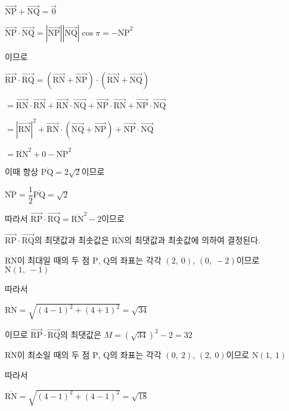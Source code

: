 \documentclass{oblivoir}
\begin{document}
$\overrightarrow{\mathrm{NP}} +\overrightarrow{\mathrm{NQ}} =\overrightarrow{0}$

$\overrightarrow{\mathrm{NP}}\cdot\overrightarrow{\mathrm{NQ}}= |\overrightarrow{\mathrm{NP}}| |\overrightarrow{\mathrm{NQ}}|\cos\pi = -\overline{\mathrm{NP}}^{2}$

이므로

$\overrightarrow{\mathrm{RP}}\cdot\overrightarrow{\mathrm{RQ}}$$=(\overrightarrow{\mathrm{RN}} +\overrightarrow{\mathrm{NP}})\cdot(\overrightarrow{\mathrm{RN}} +\overrightarrow{\mathrm{NQ}})$

$=\overrightarrow{\mathrm{RN}}\cdot\overrightarrow{\mathrm{RN}} +\overrightarrow{\mathrm{RN}}\cdot\overrightarrow{\mathrm{NQ}} +\overrightarrow{\mathrm{NP}}\cdot\overrightarrow{\mathrm{RN}} +\overrightarrow{\mathrm{NP}}\cdot\overrightarrow{\mathrm{NQ}}$

$= |\overrightarrow{\mathrm{RN}} |^{2}+\overrightarrow{\mathrm{RN}}\cdot(\overrightarrow{\mathrm{NQ}} +\overrightarrow{\mathrm{NP}})+\overrightarrow{\mathrm{NP}}\cdot\overrightarrow{\mathrm{NQ}}$

$=\overline{\mathrm{RN}}^{2}+0 -\overline{\mathrm{NP}}^{2}$

이때 항상 $\overline{\mathrm{PQ}} = 2\sqrt{2}$이므로

$\overline{\mathrm{NP}} =\dfrac{1}{2}\overline{\mathrm{PQ}} =\sqrt{2}$

따라서 $\overrightarrow{\mathrm{RP}}\cdot\overrightarrow{\mathrm{RQ}}$$=\overline{\mathrm{RN}}^{2}-2$이므로 

$\overrightarrow{\mathrm{RP}}\cdot\overrightarrow{\mathrm{RQ}}$의 최댓값과 최솟값은 $\overline{\mathrm{RN}}$의 최댓값과 최솟값에 의하여 결정된다.

$\overline{\mathrm{RN}}$이 최대일 때의 두 점 $\mathrm{P}$, $\mathrm{Q}$의 좌표는 각각 $(2,\:  0)$, $(0,\:  -2)$이므로 $\mathrm{N}(1,\: -1)$

따라서 

$\overline{\mathrm{RN}} =\sqrt{(4-1)^{2}+(4+1)^{2}}=\sqrt{34}$

이므로 $\overrightarrow{\mathrm{RP}}\cdot\overrightarrow{\mathrm{RQ}}$의 최댓값은 $M=(\sqrt{34})^{2}- 2 = 32$

$\overline{\mathrm{RN}}$이 최소일 때의 두 점 $\mathrm{P}$, $\mathrm{Q}$의 좌표는 각각 $(0,\:  2)$, $(2,\:  0)$이므로 $\mathrm{N}(1,\: 1)$

따라서 

$\overline{\mathrm{RN}} =\sqrt{(4-1)^{2}+(4-1)^{2}}=\sqrt{18}$
\end{document}
